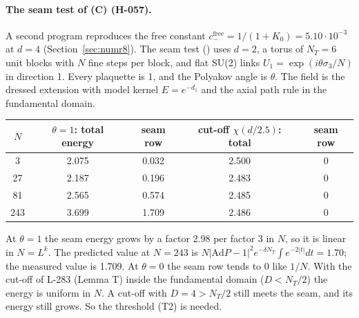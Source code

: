 \paragraph{The seam test of (C) (H-057).} A second program reproduces the free constant $c_-^{\mathrm{free}}=1/(1+K_0)=5.10\cdot10^{-3}$ at $d=4$ (Section~\ref{sec:numr8}). The seam test () uses $d=2$, a torus of $N_T=6$ unit blocks with $N$ fine steps per block, and flat SU(2) links $U_1=\exp(i\theta\sigma_3/N)$ in direction 1. Every plaquette is 1, and the Polyakov angle is $\theta$. The field is the dressed extension with model kernel $E=e^{-d_1}$ and the axial path rule in the fundamental domain.
\begin{longtable}{|c|c|c|c|c|}
\hline
$N$ & $\theta=1$: total energy & seam row & cut-off $\chi(d/2.5)$: total & seam row \\ \hline
3 & 2.075 & 0.032 & 2.500 & 0 \\ \hline
27 & 2.187 & 0.196 & 2.483 & 0 \\ \hline
81 & 2.565 & 0.574 & 2.485 & 0 \\ \hline
243 & 3.699 & 1.709 & 2.486 & 0 \\ \hline
\end{longtable}
At $\theta=1$ the seam energy grows by a factor 2.98 per factor 3 in $N$, so it is linear in $N=L^k$. The predicted value at $N=243$ is $N|\mathrm{Ad}P-1|^2e^{-\delta N_T}\int e^{-2|t|}dt=1.70$; the measured value is 1.709. At $\theta=0$ the seam row tends to 0 like $1/N$. With the cut-off of L-283 (Lemma T) inside the fundamental domain ($D<N_T/2$) the energy is uniform in $N$. A cut-off with $D=4>N_T/2$ still meets the seam, and its energy still grows. So the threshold (T2) is needed.

